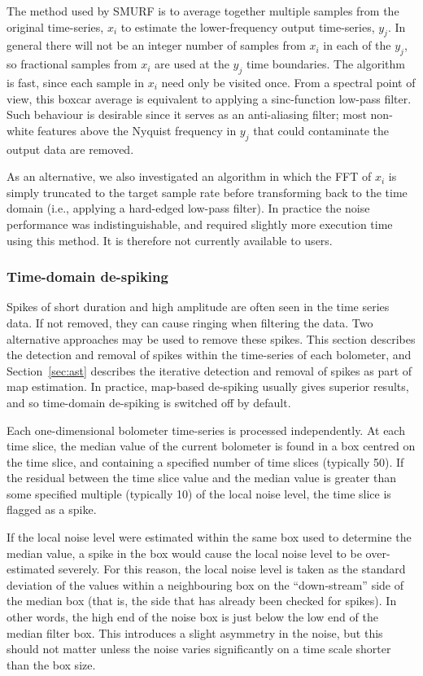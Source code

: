 \documentclass[useAMS,usenatbib,nofootinbib]{mn2e}
\begin{document}
The method used by SMURF is to average together multiple samples from
the original time-series, $x_i$ to estimate the lower-frequency output
time-series, $y_j$. In general there will not be an integer number of
samples from $x_i$ in each of the $y_j$, so fractional samples from
$x_i$ are used at the $y_j$ time boundaries. The algorithm is fast,
since each sample in $x_i$ need only be visited once. From a spectral
point of view, this boxcar average is equivalent to applying a
sinc-function low-pass filter. Such behaviour is desirable since it
serves as an anti-aliasing filter; most non-white features above the
Nyquist frequency in $y_j$ that could contaminate the output data are
removed.

As an alternative, we also investigated an algorithm in which the FFT
of $x_i$ is simply truncated to the target sample rate before
transforming back to the time domain (i.e., applying a hard-edged
low-pass filter). In practice the noise performance was
indistinguishable, and required slightly more execution time using
this method. It is therefore not currently available to users.

\subsubsection{Time-domain de-spiking}
\label{sec:timedespike}

Spikes of short duration and high amplitude are often seen in the time
series data. If not removed, they can cause ringing when filtering the
data. Two alternative approaches may be used to remove these
spikes. This section describes the detection and removal of spikes
within the time-series of each bolometer, and Section~\ref{sec:ast}
describes the iterative detection and removal of spikes as part of map
estimation. In practice, map-based de-spiking usually gives superior
results, and so time-domain de-spiking is switched off by default.

Each one-dimensional bolometer time-series is processed
independently. At each time slice, the median value of the current
bolometer is found in a box centred on the time slice, and containing
a specified number of time slices (typically 50). If the residual
between the time slice value and the median value is greater than some
specified multiple (typically 10) of the local noise level, the time
slice is flagged as a spike.

If the local noise level were estimated within the same box used to
determine the median value, a spike in the box would cause the local
noise level to be over-estimated severely. For this reason, the local
noise level is taken as the standard deviation of the values within a
neighbouring box on the ``down-stream'' side of the median box (that
is, the side that has already been checked for spikes). In other
words, the high end of the noise box is just below the low end of the
median filter box. This introduces a slight asymmetry in the noise,
but this should not matter unless the noise varies significantly on a
time scale shorter than the box size.
\end{document}
